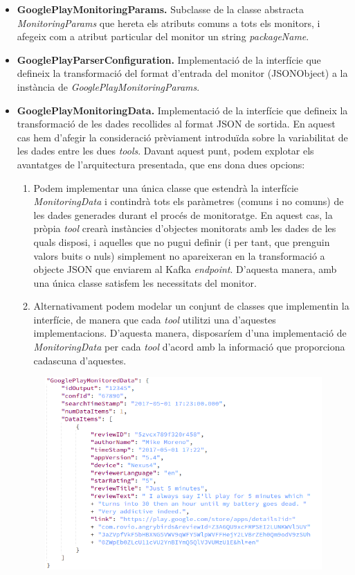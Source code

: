 \begin{itemize}
\item \textbf{GooglePlayMonitoringParams.} Subclasse de la classe abstracta \textit{MonitoringParams} que hereta els atributs comuns a tots els monitors, i afegeix com a atribut particular del monitor un string \textit{packageName}.
\item \textbf{GooglePlayParserConfiguration.} Implementació de la interfície que defineix la transformació del format d'entrada del monitor (JSONObject) a la instància de \textit{GooglePlayMonitoringParams}.
\item \textbf{GooglePlayMonitoringData.} Implementació de la interfície que defineix la transformació de les dades recollides al format JSON de sortida. En aquest cas hem d'afegir la consideració prèviament introduïda sobre la variabilitat de les dades entre les dues \textit{tools}. Davant aquest punt, podem explotar els avantatges de l'arquitectura presentada, que ens dona dues opcions:
\begin{enumerate}
\item Podem implementar una única classe que estendrà la interfície \textit{MonitoringData} i contindrà tots els paràmetres (comuns i no comuns) de les dades generades durant el procés de monitoratge. En aquest cas, la pròpia \textit{tool} crearà instàncies d'objectes monitorats amb les dades de les quals disposi, i aquelles que no pugui definir (i per tant, que prenguin valors buits o nuls) simplement no apareixeran en la transformació a objecte JSON que enviarem al Kafka \textit{endpoint}. D'aquesta manera, amb una única classe satisfem les necessitats del monitor.
\item Alternativament podem modelar un conjunt de classes que implementin la interfície, de manera que cada \textit{tool} utilitzi una d'aquestes implementacions. D'aquesta manera, disposaríem d'una implementació de \textit{MonitoringData} per cada \textit{tool} d'acord amb la informació que proporciona cadascuna d'aquestes.
\end{enumerate}
\begin{figure}[!h]
\centering
\includegraphics[width=14cm]{Figures/Figure13}

\end{figure}
\end{itemize}
